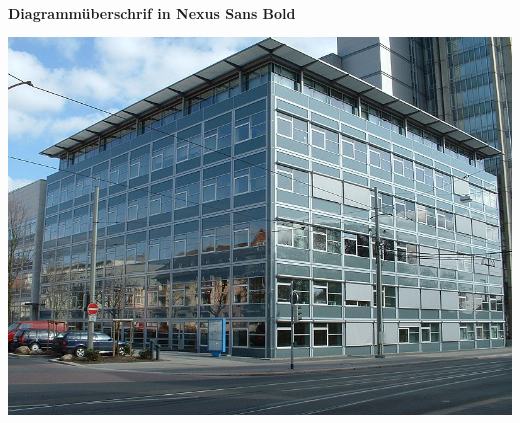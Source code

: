 \documentclass[a4paper,bcor=0mm,9pt,parskip=full,twoside]{tubsartcl}
\begin{document}
\vspace*{2.5cm}
\setlength\postmulticols{0mm}
\begin{minipage}{\textwidth}
\begin{multicols}{2}
\lipsum[2]\par~\par\columnbreak
\lipsum[4]\par
\end{multicols}
\end{minipage}
\vspace*{0.5cm}
\begin{multicols*}{2}
\bfseries\sffamily Diagrammüberschrif in Nexus Sans Bold\par
\includegraphics[width=\linewidth]{infozentrum}
\end{multicols*}
\clearpage

\begin{gaussbox}[bgcolor=tubsGray20]{1}{1}{4}{2}
\end{gaussbox}
\begin{gaussbox}[bgcolor=tubsGray20]{5}{1}{2}{1}
\end{gaussbox}
\begin{gaussbox}[bgcolor=tubsGray20]{5}{2}{2}{1}
\end{gaussbox}
\begin{gaussbox}[bgcolor=tuOrangeLight]{1}{3}{6}{6}
\twocolumn[]%
\lipsum[2]\par
\lipsum[2]\par
\end{gaussbox}
\clearpage
\end{document}
